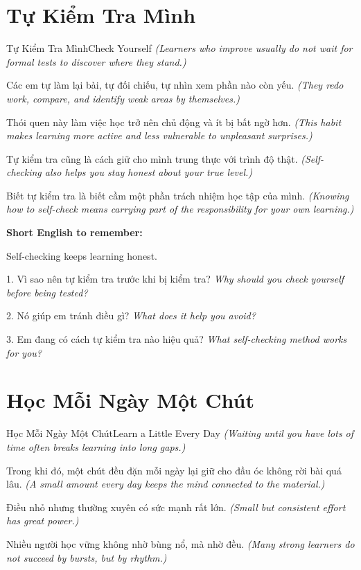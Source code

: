 \section{Tự Kiểm Tra Mình}
\begin{truyen}{Tự Kiểm Tra Mình}{Check Yourself}
\textit{(Learners who improve usually do not wait for formal tests to discover where they stand.)}

Các em tự làm lại bài, tự đối chiếu, tự nhìn xem phần nào còn yếu.
\textit{(They redo work, compare, and identify weak areas by themselves.)}

Thói quen này làm việc học trở nên chủ động và ít bị bất ngờ hơn.
\textit{(This habit makes learning more active and less vulnerable to unpleasant surprises.)}

Tự kiểm tra cũng là cách giữ cho mình trung thực với trình độ thật.
\textit{(Self-checking also helps you stay honest about your true level.)}
\end{truyen}

\begin{baihoc}
Biết tự kiểm tra là biết cầm một phần trách nhiệm học tập của mình.
\textit{(Knowing how to self-check means carrying part of the responsibility for your own learning.)}
\end{baihoc}

\begin{ghinhoanh}
\textbf{Short English to remember:}

Self-checking keeps learning honest.

\end{ghinhoanh}

\begin{tuhocnhanh}
1. Vì sao nên tự kiểm tra trước khi bị kiểm tra? \textit{Why should you check yourself before being tested?}

2. Nó giúp em tránh điều gì? \textit{What does it help you avoid?}

3. Em đang có cách tự kiểm tra nào hiệu quả? \textit{What self-checking method works for you?}
\end{tuhocnhanh}
\ngancach

\section{Học Mỗi Ngày Một Chút}
\begin{truyen}{Học Mỗi Ngày Một Chút}{Learn a Little Every Day}
\textit{(Waiting until you have lots of time often breaks learning into long gaps.)}

Trong khi đó, một chút đều đặn mỗi ngày lại giữ cho đầu óc không rời bài quá lâu.
\textit{(A small amount every day keeps the mind connected to the material.)}

Điều nhỏ nhưng thường xuyên có sức mạnh rất lớn.
\textit{(Small but consistent effort has great power.)}

Nhiều người học vững không nhờ bùng nổ, mà nhờ đều.
\textit{(Many strong learners do not succeed by bursts, but by rhythm.)}
\end{truyen}

